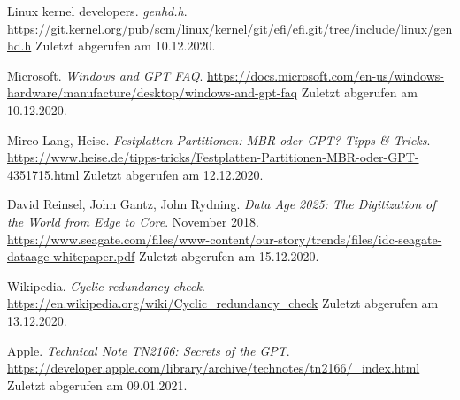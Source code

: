 \begin{thebibliography}{99}
        Linux kernel developers.
        \textit{genhd.h}.
        \url{https://git.kernel.org/pub/scm/linux/kernel/git/efi/efi.git/tree/include/linux/genhd.h}
        Zuletzt abgerufen am 10.12.2020.

        Microsoft.
        \textit{Windows and GPT FAQ}.
        \url{https://docs.microsoft.com/en-us/windows-hardware/manufacture/desktop/windows-and-gpt-faq}
        Zuletzt abgerufen am 10.12.2020.

        Mirco Lang, Heise.
        \textit{Festplatten-Partitionen: MBR oder GPT? Tipps \& Tricks}.
        \url{https://www.heise.de/tipps-tricks/Festplatten-Partitionen-MBR-oder-GPT-4351715.html}
        Zuletzt abgerufen am 12.12.2020.

        David Reinsel, John Gantz, John Rydning.
        \textit{Data Age 2025: The Digitization of the World from Edge to Core}.
        November 2018.
        \url{https://www.seagate.com/files/www-content/our-story/trends/files/idc-seagate-dataage-whitepaper.pdf}
        Zuletzt abgerufen am 15.12.2020.

        Wikipedia.
        \textit{Cyclic redundancy check}.
        \url{https://en.wikipedia.org/wiki/Cyclic_redundancy_check}
        Zuletzt abgerufen am 13.12.2020.

        Apple.
        \textit{Technical Note TN2166: Secrets of the GPT}.
        \url{https://developer.apple.com/library/archive/technotes/tn2166/_index.html}
        Zuletzt abgerufen am 09.01.2021.
\end{thebibliography}
